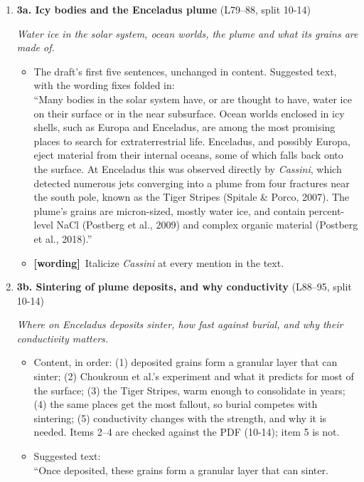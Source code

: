 \documentclass[11pt]{article}
\newcommand{\Pg}[3]{\item \textbf{#1} {\small(#2)}\par\textit{#3}}
\newcommand{\tG}{\textcolor{stale}{\textbf{[wording]}}\ }
\begin{document}
\begin{enumerate}
\begin{itemize}
    within them (Calonne et al., 2011, 2019), and it is an input of the
    detailed snowpack models used to follow their evolution (Lehning et al.,
    2002; Vionnet et al., 2012).'' All four are in the \texttt{.bib}; check
    each claim against the paper.
  \end{itemize}
\Pg{3a. Icy bodies and the Enceladus plume}{L79--88, split 10-14}{Water ice in the solar system, ocean worlds, the plume and what its grains are made of.}
  \begin{itemize}
  \item The draft's first five sentences, unchanged in content. Suggested
    text, with the wording fixes folded in:\\
    ``Many bodies in the solar system have, or are thought to have, water
    ice on their surface or in the near subsurface. Ocean worlds enclosed in
    icy shells, such as Europa and Enceladus, are among the most promising
    places to search for extraterrestrial life. Enceladus, and possibly
    Europa, eject material from their internal oceans, some of which falls
    back onto the surface. At Enceladus this was observed directly by
    \textit{Cassini}, which detected numerous jets converging into a plume
    from four fractures near the south pole, known as the Tiger Stripes
    (Spitale \& Porco, 2007). The plume's grains are micron-sized, mostly
    water ice, and contain percent-level NaCl (Postberg et al., 2009) and
    complex organic material (Postberg et al., 2018).''
  \item \tG Italicize \textit{Cassini} at every mention in the text.
  \end{itemize}
\Pg{3b. Sintering of plume deposits, and why conductivity}{L88--95, split 10-14}{Where on Enceladus deposits sinter, how fast against burial, and why their conductivity matters.}
  \begin{itemize}
  \item Content, in order: (1) deposited grains form a granular layer that
    can sinter; (2) Choukroun et al.'s experiment and what it predicts for
    most of the surface; (3) the Tiger Stripes, warm enough to consolidate
    in years; (4) the same places get the most fallout, so burial competes
    with sintering; (5) conductivity changes with the strength, and why it
    is needed. Items 2--4 are checked against the PDF (10-14); item 5 is
    not.
  \item Suggested text:\\
    ``Once deposited, these grains form a granular layer that can sinter.

\end{itemize}
\end{enumerate}
\end{document}
